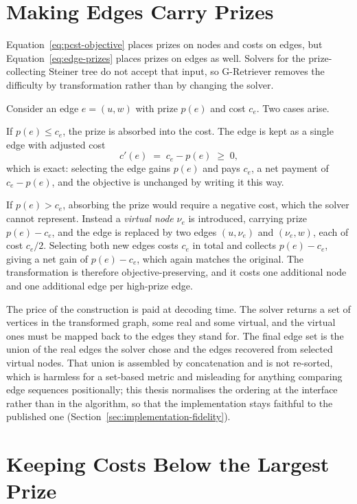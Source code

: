 \section{Making Edges Carry Prizes} \label{sec:virtual-nodes}

Equation~\ref{eq:pcst-objective} places prizes on nodes and costs on edges, but
Equation~\ref{eq:edge-prizes} places prizes on edges as well. Solvers for the
prize-collecting Steiner tree do not accept that input, so G-Retriever removes
the difficulty by transformation rather than by changing the solver.

Consider an edge $e = (u, w)$ with prize $p(e)$ and cost $c_e$. Two cases arise.

If $p(e) \leq c_e$, the prize is absorbed into the cost. The edge is kept as a
single edge with adjusted cost
%
\begin{equation}
c'(e) \;=\; c_e - p(e) \;\geq\; 0 ,
\label{eq:absorbed-cost}
\end{equation}
%
which is exact: selecting the edge gains $p(e)$ and pays $c_e$, a net payment of
$c_e - p(e)$, and the objective is unchanged by writing it this way.

If $p(e) > c_e$, absorbing the prize would require a negative cost, which the
solver cannot represent. Instead a \emph{virtual node} $\nu_e$ is introduced,
carrying prize $p(e) - c_e$, and the edge is replaced by two edges
$(u, \nu_e)$ and $(\nu_e, w)$, each of cost $c_e / 2$. Selecting both new edges
costs $c_e$ in total and collects $p(e) - c_e$, giving a net gain of
$p(e) - c_e$, which again matches the original. The transformation is therefore
objective-preserving, and it costs one additional node and one additional edge
per high-prize edge.

The price of the construction is paid at decoding time. The solver returns a set
of vertices in the transformed graph, some real and some virtual, and the virtual
ones must be mapped back to the edges they stand for. The final edge set is the
union of the real edges the solver chose and the edges recovered from selected
virtual nodes. That union is assembled by concatenation and is not re-sorted,
which is harmless for a set-based metric and misleading for anything comparing
edge sequences positionally; this thesis normalises the ordering at the interface
rather than in the algorithm, so that the implementation stays faithful to the
published one (Section~\ref{sec:implementation-fidelity}).

\section{Keeping Costs Below the Largest Prize} \label{sec:cost-adjustment}

